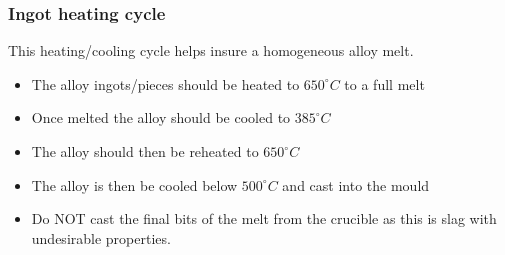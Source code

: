 \subsubsection{Ingot heating cycle}

This heating/cooling cycle helps insure a homogeneous alloy melt.
\begin{itemize}
\item The \MgZnCa alloy ingots/pieces should be heated to $650^{\circ}C$ to a full melt
\item Once melted the alloy should be cooled to $385^{\circ}C$
\item The alloy should then be reheated to $650^{\circ}C$
\item The alloy is then be cooled below $500^{\circ}C$ and cast into the mould
\item Do NOT cast the final bits of the melt from the crucible as this is slag with undesirable properties. 
\end{itemize}